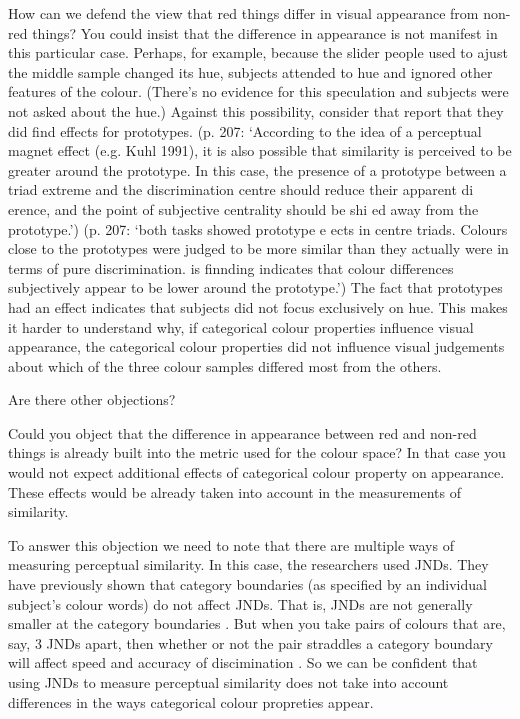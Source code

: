 \documentclass[12pt,\papersize]{extarticle}
\begin{document}
How can we defend the view that red things differ in visual appearance from non-red things?
You could insist that the difference in appearance is not manifest in this particular case.
Perhaps, for example, because the slider people used to ajust the middle sample changed
its hue, subjects attended to hue and ignored other features of the colour.
(There’s no evidence for this speculation and subjects were not asked about the hue.)
Against this possibility, consider that \citep{witzel2014category} report that they
did find effects for prototypes.
(p. 207: ‘According to the idea of a perceptual magnet effect (e.g. Kuhl 1991), it is also possible that similarity is perceived to be greater around the prototype. In this case, the presence of a prototype between a triad extreme and the discrimination centre should reduce their apparent di erence, and the point of subjective centrality should be shi ed away from the prototype.’)
(p. 207: ‘both tasks showed prototype e ects in centre triads. Colours close to the prototypes were judged to be more similar than they actually were in terms of pure discrimination.  is  finnding indicates that colour differences subjectively appear to be lower around the prototype.’)
The fact that prototypes had an effect indicates that subjects did not focus exclusively
on hue.
This makes it harder to understand why, if categorical colour properties influence
visual appearance, the categorical colour properties did not influence visual
judgements about which of the three colour samples differed most from the others.

Are there other objections?

Could you object that the difference in appearance between red and non-red things
is already built into the metric used for the colour space?  In that case you would not
expect additional effects of categorical colour property on appearance. These effects would be
already taken into account in the measurements of similarity.

To answer this objection we need to note that there are multiple ways of
measuring perceptual similarity.
In this case, the researchers used JNDs.
They have previously shown that category boundaries (as specified by an individual
subject’s colour words) do not affect JNDs.  That is, JNDs are not generally smaller at the
category boundaries \citep{witzel:2013_categorical}.
But when you take pairs of colours that are, say, 3 JNDs apart, then whether or not
the pair straddles a category boundary will affect speed and accuracy of discimination
\citep{witzel:2014_categorical}.
So we can be confident that using JNDs to measure perceptual similarity does not
take into account differences in the ways categorical colour propreties appear.
\end{document}
